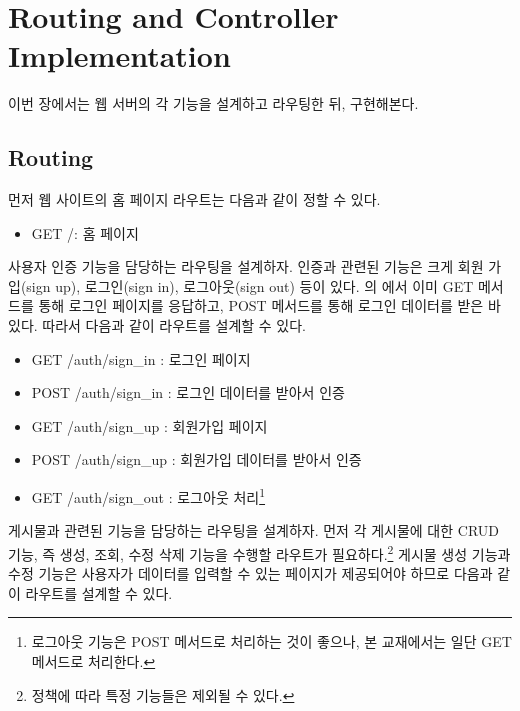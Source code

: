 \section{Routing and Controller Implementation}\label{sect:web-app-routing-controller}

이번 장에서는 웹 서버의 각 기능을 설계하고 라우팅한 뒤, 구현해본다.

\subsection*{Routing}

먼저 웹 사이트의 홈 페이지 라우트는 다음과 같이 정할 수 있다.

\begin{itemize}
    \item GET /: 홈 페이지
\end{itemize}

사용자 인증 기능을 담당하는 라우팅을 설계하자. 인증과 관련된 기능은 크게 회원 가입(sign up), 로그인(sign in), 로그아웃(sign out) 등이 있다. 의 에서 이미 GET 메서드를 통해 로그인 페이지를 응답하고, POST 메서드를 통해 로그인 데이터를 받은 바 있다. 따라서 다음과 같이 라우트를 설계할 수 있다.

\begin{itemize}
    \item GET /auth/sign\_in : 로그인 페이지
    \item POST /auth/sign\_in : 로그인 데이터를 받아서 인증
    \item GET /auth/sign\_up : 회원가입 페이지
    \item POST /auth/sign\_up : 회원가입 데이터를 받아서 인증
    \item GET /auth/sign\_out : 로그아웃 처리\footnote{로그아웃 기능은 POST 메서드로 처리하는 것이 좋으나, 본 교재에서는 일단 GET 메서드로 처리한다.}
\end{itemize}

게시물과 관련된 기능을 담당하는 라우팅을 설계하자. 먼저 각 게시물에 대한 CRUD 기능, 즉 생성, 조회, 수정 삭제 기능을 수행할 라우트가 필요하다.\footnote{정책에 따라 특정 기능들은 제외될 수 있다.} 게시물 생성 기능과 수정 기능은 사용자가 데이터를 입력할 수 있는 페이지가 제공되어야 하므로 다음과 같이 라우트를 설계할 수 있다.

